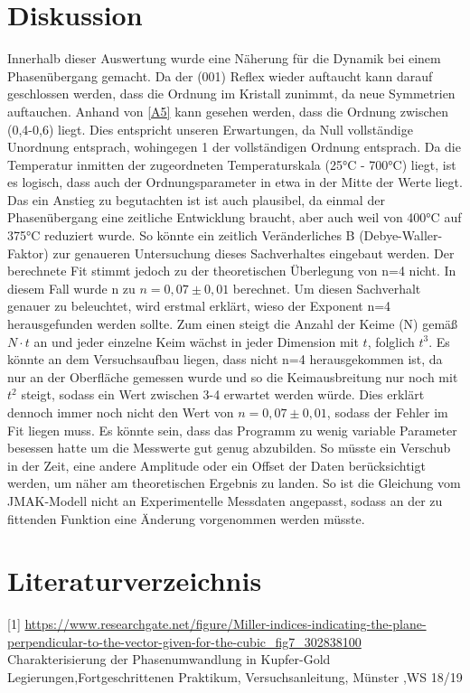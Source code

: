 \section{Diskussion}
Innerhalb dieser Auswertung wurde eine Näherung für die Dynamik bei einem Phasenübergang gemacht. Da der (001) Reflex wieder auftaucht kann darauf geschlossen werden, dass die Ordnung im Kristall zunimmt, da neue Symmetrien auftauchen. Anhand von \cref{A5} kann gesehen werden, dass die Ordnung zwischen (0,4-0,6) liegt. Dies entspricht unseren Erwartungen, da Null vollständige Unordnung entsprach, wohingegen 1 der vollständigen Ordnung entsprach. Da die Temperatur inmitten der zugeordneten Temperaturskala (25°C - 700°C) liegt, ist es logisch, dass auch der Ordnungsparameter in etwa in der Mitte der Werte liegt. Das ein Anstieg zu begutachten ist ist auch plausibel, da einmal der Phasenübergang eine zeitliche Entwicklung braucht, aber auch weil von 400°C auf 375°C reduziert wurde. So könnte ein zeitlich Veränderliches B (Debye-Waller-Faktor) zur genaueren Untersuchung dieses Sachverhaltes eingebaut werden. Der berechnete Fit stimmt jedoch zu der theoretischen Überlegung von n=4 nicht. In diesem Fall wurde n zu $n=0,07 \pm 0,01$ berechnet. Um diesen Sachverhalt genauer zu beleuchtet, wird erstmal erklärt, wieso der Exponent n=4  herausgefunden werden sollte. Zum einen steigt die Anzahl der Keime (N) gemäß $N \cdot t$ an und jeder einzelne Keim wächst in jeder Dimension mit $t$, folglich $t^3$. Es könnte an dem Versuchsaufbau liegen, dass nicht n=4 herausgekommen ist, da nur an der Oberfläche gemessen wurde und so die Keimausbreitung nur noch mit $t^2$ steigt, sodass ein Wert zwischen 3-4 erwartet werden würde. Dies erklärt dennoch immer noch nicht den Wert von $n=0,07 \pm 0,01$, sodass der Fehler im Fit liegen muss. Es könnte sein, dass das Programm zu wenig variable Parameter besessen hatte um die Messwerte gut genug abzubilden. So müsste ein Verschub in der Zeit, eine andere Amplitude oder ein Offset der Daten berücksichtigt werden, um näher am theoretischen Ergebnis zu landen. So ist die Gleichung vom JMAK-Modell nicht an Experimentelle Messdaten angepasst, sodass an der zu fittenden Funktion eine Änderung vorgenommen werden müsste.

\section{Literaturverzeichnis}
[1] \url{https://www.researchgate.net/figure/Miller-indices-indicating-the-plane-perpendicular-to-the-vector-given-for-the-cubic_fig7_302838100}\\
[2] Charakterisierung der Phasenumwandlung in Kupfer-Gold Legierungen,Fortgeschrittenen Praktikum, Versuchsanleitung, Münster ,WS 18/19









